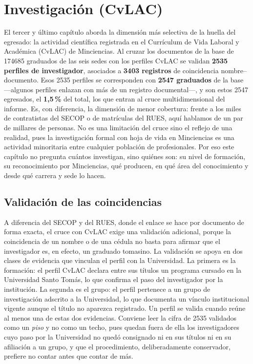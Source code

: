 \section{Investigación (CvLAC)}

El tercer y último capítulo aborda la dimensión más selectiva de la huella del egresado: la actividad científica registrada en el Currículum de Vida Laboral y Académica (CvLAC) de Minciencias. Al cruzar los documentos de la base de \num{174685} graduados de las seis sedes con los perfiles CvLAC se validan \textbf{\num{2535} perfiles de investigador}, asociados a \textbf{\num{3403} registros} de coincidencia nombre--documento. Esos \num{2535} perfiles se corresponden con \textbf{\num{2547} graduados} de la base ---algunos perfiles enlazan con más de un registro documental---, y son estos \num{2547} egresados, el \textbf{1,5\,\%} del total, los que entran al cruce multidimensional del informe. Es, con diferencia, la dimensión de menor cobertura: frente a los miles de contratistas del SECOP o de matrículas del RUES, aquí hablamos de un par de millares de personas. No es una limitación del cruce sino el reflejo de una realidad, pues la investigación formal con hoja de vida en Minciencias es una actividad minoritaria entre cualquier población de profesionales. Por eso este capítulo no pregunta cuántos investigan, sino quiénes son: su nivel de formación, su reconocimiento por Minciencias, qué producen, en qué área del conocimiento y desde qué carrera y sede lo hacen.

\subsection{Validación de las coincidencias}
A diferencia del SECOP y del RUES, donde el enlace se hace por documento de forma exacta, el cruce con CvLAC exige una validación adicional, porque la coincidencia de un nombre o de una cédula no basta para afirmar que el investigador es, en efecto, un graduado tomasino. La validación se apoya en dos clases de evidencia que vinculan el perfil con la Universidad. La primera es la formación: el perfil CvLAC declara entre sus títulos un programa cursado en la Universidad Santo Tomás, lo que confirma el paso del investigador por la institución. La segunda es el grupo: el perfil pertenece a un grupo de investigación adscrito a la Universidad, lo que documenta un vínculo institucional vigente aunque el título no aparezca registrado. Un perfil se valida cuando reúne al menos una de estas dos evidencias. Conviene leer la cifra de \num{2535} validados como un \emph{piso} y no como un techo, pues quedan fuera de ella los investigadores cuyo paso por la Universidad no quedó consignado ni en sus títulos ni en su afiliación a un grupo, y que el procedimiento, deliberadamente conservador, prefiere no contar antes que contar de más.

